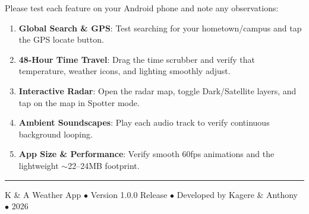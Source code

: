 \documentclass[11pt,a4paper]{article}
\begin{document}
\begin{alertbox}
Please test each feature on your Android phone and note any observations:
\begin{enumerate}[leftmargin=1.5em, itemsep=3pt]
  \item \textbf{Global Search \& GPS}: Test searching for your hometown/campus and tap the GPS locate button.
  \item \textbf{48-Hour Time Travel}: Drag the time scrubber and verify that temperature, weather icons, and lighting smoothly adjust.
  \item \textbf{Interactive Radar}: Open the radar map, toggle Dark/Satellite layers, and tap on the map in Spotter mode.
  \item \textbf{Ambient Soundscapes}: Play each audio track to verify continuous background looping.
  \item \textbf{App Size \& Performance}: Verify smooth 60fps animations and the lightweight $\sim$22--24MB footprint.
\end{enumerate}
\end{alertbox}

\vspace{1.5em}
\noindent\rule{\textwidth}{0.4pt}
\begin{center}
{\small\color{SlateMuted}\textsf{K \& A Weather App $\bullet$ Version 1.0.0 Release $\bullet$ Developed by Kagere \& Anthony $\bullet$ 2026}}
\end{center}
\end{document}
